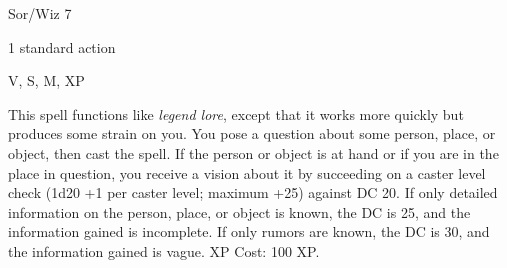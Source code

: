 
\begin{description*}
\item[Level:] Sor/Wiz 7
\item[Casting Time:] 1 standard action
\item[Components:] V, S, M, XP
\end{description*}

This spell functions like \textit{legend lore}, except that it works more quickly
but produces some strain on you. You pose a question about some person, place,
or object, then cast the spell. If the person or object is at hand or if you are
in the place in question, you receive a vision about it by succeeding on a caster
level check (1d20 +1 per caster level; maximum +25) against DC 20. If only detailed
information on the person, place, or object is known, the DC is 25, and the information
gained is incomplete. If only rumors are known, the DC is 30, and the information
gained is vague.
XP Cost: 100 XP.